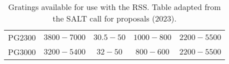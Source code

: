 \begin{table}[t]
\begin{tabular}{ccccc}
    PG2300                                 & $3800 - 7000$                                                             & $30.5 - 50$                                                     & $1000 - 800$                                                            & $2200 - 5500$                                                                  \\
    PG3000                                 & $3200 - 5400$                                                             & $32 - 50$                                                       & $800 - 600$                                                             & $2200 - 5500$                                                                  \\ \hline
  \end{tabular}
  \caption{Gratings available for use with the \gls{RSS}. Table adapted from the \gls{SALT} call for proposals (2023).}
  \label{table:RSS_gratings}
\end{table}
